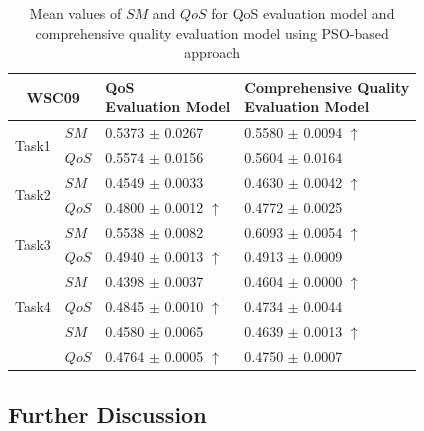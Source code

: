 \documentclass{llncs}
\begin{document}
\begin{table}[]
\footnotesize
\centering
\caption{Mean values of $SM$ and $QoS$ for QoS evaluation model and comprehensive quality evaluation model using PSO-based approach}
\label{decisionTable}
\begin{tabular}{c|l|l|l}
\hline
\multicolumn{2}{c|}{WSC09}              & \shortstack{QoS \\ Evaluation Model}         &\shortstack{Comprehensive Quality \\ Evaluation Model} \\ \hline
\multirow{2}{*}{Task1}  &$SM$   &0.5373 $\pm$ 0.0267               &0.5580 $\pm$ 0.0094 $\uparrow$ \\ \cline{2-4}
                        &$QoS$  &0.5574 $\pm$ 0.0156               &0.5604 $\pm$ 0.0164                          \\ \hline
\multirow{2}{*}{Task2}  &$SM$   &0.4549 $\pm$ 0.0033               &0.4630 $\pm$ 0.0042 $\uparrow$ \\ \cline{2-4} 
                        &$QoS$  &0.4800 $\pm$ 0.0012 $\uparrow$    &0.4772 $\pm$ 0.0025 \\ \hline
\multirow{2}{*}{Task3}  &$SM$   &0.5538 $\pm$ 0.0082               &0.6093 $\pm$ 0.0054 $\uparrow$   \\ \cline{2-4} 
                        &$QoS$  &0.4940 $\pm$ 0.0013 $\uparrow$    &0.4913 $\pm$ 0.0009            \\ \hline
\multirow{3}{*}{Task4}  &$SM$   &0.4398 $\pm$ 0.0037               &0.4604 $\pm$ 0.0000 $\uparrow$ \\ \cline{2-4} 
                        &$QoS$  &0.4845 $\pm$ 0.0010 $\uparrow$    &0.4734 $\pm$ 0.0044  \\ \hline
\multirow{3}{*}{Task5}  &$SM$   &0.4580 $\pm$ 0.0065               &0.4639 $\pm$ 0.0013 $\uparrow$           \\ \cline{2-4} 
                        &$QoS$  &0.4764 $\pm$ 0.0005 $\uparrow$    &0.4750 $\pm$ 0.0007  \\ \hline                                                   
\end{tabular}
\end{table}

\subsection{Further Discussion}\label{discuss1}
\end{document}
